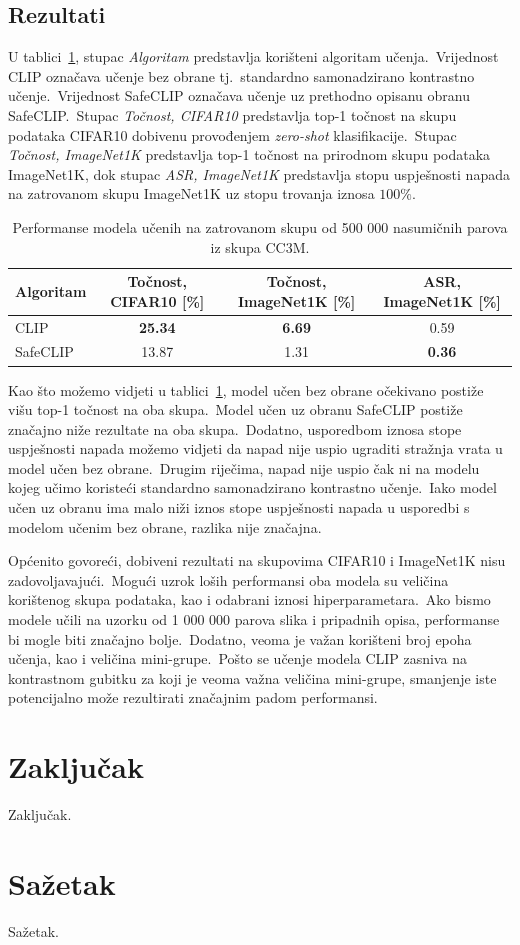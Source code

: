 \documentclass[times, utf8, seminar, numeric]{fer}
\begin{document}
\section{Rezultati}

U tablici~\ref{tbl:performanse_zatrovano}, stupac \textit{Algoritam} predstavlja korišteni algoritam učenja.\ Vrijednost CLIP označava učenje bez obrane tj.\ standardno samonadzirano kontrastno učenje.\ 
Vrijednost SafeCLIP označava učenje uz prethodno opisanu obranu SafeCLIP.\ Stupac \textit{Točnost, CIFAR10} predstavlja top-1 točnost na skupu podataka CIFAR10 dobivenu provođenjem \textit{zero-shot} klasifikacije.\ 
Stupac \textit{Točnost, ImageNet1K} predstavlja top-1 točnost na prirodnom skupu podataka ImageNet1K, dok stupac \textit{ASR, ImageNet1K} predstavlja stopu uspješnosti napada na zatrovanom skupu ImageNet1K uz stopu trovanja iznosa $100\%$.\

\begin{table}[htb]
    \caption{Performanse modela učenih na zatrovanom skupu od 500 000 nasumičnih parova iz skupa CC3M.}
    \label{tbl:performanse_zatrovano}
    \centering
    \begin{tabular}{lccc} \hline
    Algoritam & Točnost, CIFAR10 [\%] & Točnost, ImageNet1K [\%] & ASR, ImageNet1K [\%] \\ \hline
    CLIP & \textbf{25.34} & \textbf{6.69} & 0.59 \\
    SafeCLIP & 13.87 & 1.31 & \textbf{0.36} \\
    \end{tabular}
\end{table}

Kao što možemo vidjeti u tablici~\ref{tbl:performanse_zatrovano}, model učen bez obrane očekivano postiže višu top-1 točnost na oba skupa.\ 
Model učen uz obranu SafeCLIP postiže značajno niže rezultate na oba skupa.\ Dodatno, usporedbom iznosa stope uspješnosti napada možemo vidjeti da napad nije uspio ugraditi stražnja vrata u model učen bez obrane.\ 
Drugim riječima, napad nije uspio čak ni na modelu kojeg učimo koristeći standardno samonadzirano kontrastno učenje.\ Iako model učen uz obranu ima malo niži iznos stope uspješnosti napada u usporedbi s modelom učenim bez obrane, razlika nije značajna.\ 
  
Općenito govoreći, dobiveni rezultati na skupovima CIFAR10 i ImageNet1K nisu zadovoljavajući.\ Mogući uzrok loših performansi oba modela su veličina korištenog skupa podataka, kao i odabrani iznosi hiperparametara.\
Ako bismo modele učili na uzorku od 1 000 000 parova slika i pripadnih opisa, performanse bi mogle biti značajno bolje.\ Dodatno, veoma je važan korišteni broj epoha učenja, kao i veličina mini-grupe.\ 
Pošto se učenje modela CLIP zasniva na kontrastnom gubitku za koji je veoma važna veličina mini-grupe, smanjenje iste potencijalno može rezultirati značajnim padom performansi.\

\chapter{Zaključak}

Zaključak.




\chapter{Sažetak}
Sažetak.
\end{document}
